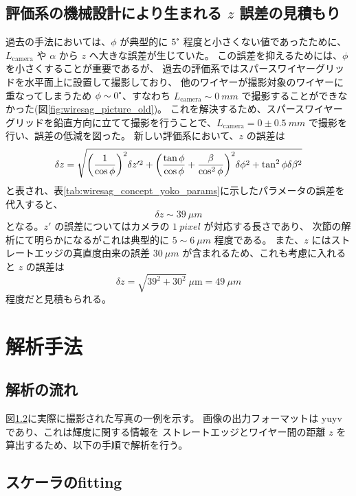\documentclass[../../main.tex]{subfiles}
\begin{document}
\subsection{評価系の機械設計により生まれる $z$ 誤差の見積もり}
過去の手法においては、$\phi$ が典型的に $5\tcdegree$ 程度と小さくない値であったために、
$L_{\mathrm{camera}}$ や $\alpha$ から $z$ へ大きな誤差が生じていた\cite{swg:murata}。
この誤差を抑えるためには、$\phi$ を小さくすることが重要であるが、
過去の評価系ではスパースワイヤーグリッドを水平面上に設置して撮影しており、
他のワイヤーが撮影対象のワイヤーに重なってしまうため $\phi\sim 0\tcdegree$、すなわち 
$L_{\mathrm{camera}} \sim \SI{0}{mm}$ で撮影することができなかった(図\ref{fig:wiresag_picture_old})。
これを解決するため、スパースワイヤーグリッドを鉛直方向に立てて撮影を行うことで、$L_{\mathrm{camera}}=0\pm\SI{0.5}{mm}$ で撮影を行い、誤差の低減を図った。
新しい評価系において、$z$ の誤差は
\begin{align}
    \delta z = \sqrt{\qty(\dfrac{1}{\cos\phi})^2\delta z'^2 + \qty(\dfrac{\tan\phi}{\cos\phi}+\dfrac{\beta}{\cos^2\phi})^2\delta\phi^2 + \tan^2\phi\delta\beta^2}
\end{align}
と表され、表\ref{tab:wiresag_concept_yoko_params}に示したパラメータの誤差を代入すると、
\begin{equation}
    \delta z \sim \SI{39}{\mu m}
\end{equation}
となる。$z'$ の誤差についてはカメラの $\SI{1}{pixel}$ が対応する長さであり、
次節の解析にて明らかになるがこれは典型的に $5\sim\SI{6}{\mu m}$ 程度である。
また、$z$ にはストレートエッジの真直度由来の誤差 $\SI{30}{\mu m}$ が含まれるため、これも考慮に入れると $z$ の誤差は
\begin{equation}
    \delta z = \sqrt{39^2+30^2}\ \mu\mathrm{m} = \SI{49}{\mu m}
\end{equation}
程度だと見積もられる。

\section{解析手法}
\subsection{解析の流れ}
図\ref{}に実際に撮影された写真の一例を示す。
画像の出力フォーマットは yuyv であり、これは輝度に関する情報を
ストレートエッジとワイヤー間の距離 $z$ を算出するため、以下の手順で解析を行う。

\subsection{スケーラのfitting}
\end{document}
